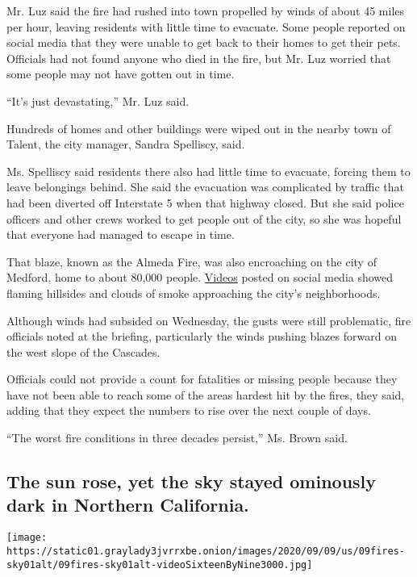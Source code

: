 Mr. Luz said the fire had rushed into town propelled by winds of about
45 miles per hour, leaving residents with little time to evacuate. Some
people reported on social media that they were unable to get back to
their homes to get their pets. Officials had not found anyone who died
in the fire, but Mr. Luz worried that some people may not have gotten
out in time.

``It's just devastating,'' Mr. Luz said.

Hundreds of homes and other buildings were wiped out in the nearby town
of Talent, the city manager, Sandra Spelliscy, said.

Ms. Spelliscy said residents there also had little time to evacuate,
forcing them to leave belongings behind. She said the evacuation was
complicated by traffic that had been diverted off Interstate 5 when that
highway closed. But she said police officers and other crews worked to
get people out of the city, so she was hopeful that everyone had managed
to escape in time.

That blaze, known as the Almeda Fire, was also encroaching on the city
of Medford, home to about 80,000 people.
\href{https://twitter.com/rajmathai/status/1303565121097064449}{Videos}
posted on social media showed flaming hillsides and clouds of smoke
approaching the city's neighborhoods.

Although winds had subsided on Wednesday, the gusts were still
problematic, fire officials noted at the briefing, particularly the
winds pushing blazes forward on the west slope of the Cascades.

Officials could not provide a count for fatalities or missing people
because they have not been able to reach some of the areas hardest hit
by the fires, they said, adding that they expect the numbers to rise
over the next couple of days.

``The worst fire conditions in three decades persist,'' Ms. Brown said.

\hypertarget{the-sun-rose-yet-the-sky-stayed-ominously-dark-in-northern-california}{%
\subsection{The sun rose, yet the sky stayed ominously dark in Northern
California.}\label{the-sun-rose-yet-the-sky-stayed-ominously-dark-in-northern-california}}

\texttt{[image: https://static01.graylady3jvrrxbe.onion/images/2020/09/09/us/09fires-sky01alt/09fires-sky01alt-videoSixteenByNine3000.jpg]}

